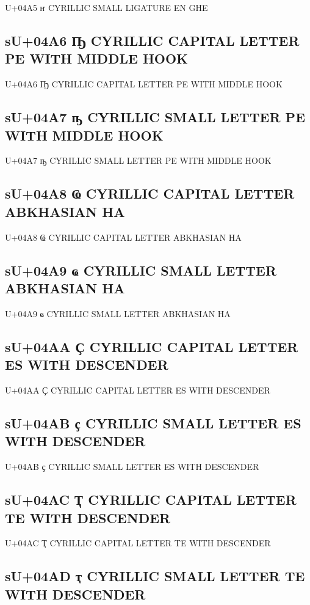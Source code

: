 U+04A5 ҥ  CYRILLIC SMALL LIGATURE EN GHE

\subsection{sU+04A6 Ҧ  CYRILLIC CAPITAL LETTER PE WITH MIDDLE HOOK}

U+04A6 Ҧ  CYRILLIC CAPITAL LETTER PE WITH MIDDLE HOOK

\subsection{sU+04A7 ҧ  CYRILLIC SMALL LETTER PE WITH MIDDLE HOOK}

U+04A7 ҧ  CYRILLIC SMALL LETTER PE WITH MIDDLE HOOK

\subsection{sU+04A8 Ҩ  CYRILLIC CAPITAL LETTER ABKHASIAN HA}

U+04A8 Ҩ  CYRILLIC CAPITAL LETTER ABKHASIAN HA

\subsection{sU+04A9 ҩ  CYRILLIC SMALL LETTER ABKHASIAN HA}

U+04A9 ҩ  CYRILLIC SMALL LETTER ABKHASIAN HA

\subsection{sU+04AA Ҫ  CYRILLIC CAPITAL LETTER ES WITH DESCENDER}

U+04AA Ҫ  CYRILLIC CAPITAL LETTER ES WITH DESCENDER

\subsection{sU+04AB ҫ  CYRILLIC SMALL LETTER ES WITH DESCENDER}

U+04AB ҫ  CYRILLIC SMALL LETTER ES WITH DESCENDER

\subsection{sU+04AC Ҭ  CYRILLIC CAPITAL LETTER TE WITH DESCENDER}

U+04AC Ҭ  CYRILLIC CAPITAL LETTER TE WITH DESCENDER

\subsection{sU+04AD ҭ  CYRILLIC SMALL LETTER TE WITH DESCENDER}

